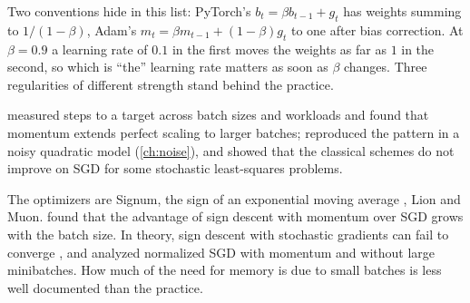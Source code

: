 \begin{refsection}
Two conventions hide in this list: PyTorch's $b_t=\beta b_{t-1}+g_t$ has weights summing to $1/(1-\beta)$, Adam's $m_t=\beta m_{t-1}+(1-\beta)g_t$ to one after bias correction. At $\beta=0.9$ a learning rate of $0.1$ in the first moves the weights as far as $1$ in the second, so which is ``the'' learning rate matters as soon as $\beta$ changes. Three regularities of different strength stand behind the practice.


\textcite{ShallueEtAl2019} measured steps to a target across batch sizes and workloads and found that momentum extends perfect scaling to larger batches; \textcite{ZhangEtAl2019} reproduced the pattern in a noisy quadratic model (\cref{ch:noise}), and \textcite{KidambiEtAl2018} showed that the classical schemes do not improve on SGD for some stochastic least-squares problems.


The optimizers are Signum, the sign of an exponential moving average \parencite{BernsteinEtAl2018}, Lion and Muon. \Textcite{KunstnerEtAl2023} found that the advantage of sign descent with momentum over SGD grows with the batch size. In theory, sign descent with stochastic gradients can fail to converge \parencite{KarimireddyEtAl2019}, and \textcite{CutkoskyMehta2020} analyzed normalized SGD with momentum and without large minibatches. How much of the need for memory is due to small batches is less well documented than the practice.


\end{refsection}
